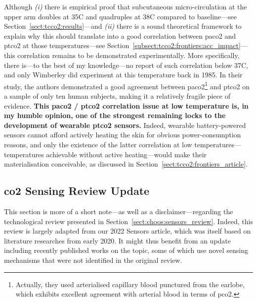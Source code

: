 Although \textit{(i)} there is empirical proof that subcutaneous micro-circulation at the upper arm doubles at 35{\degree}C and quadruples at 38{\degree}C compared to baseline---see Section~\ref{sect:tcco2:results}---and \textit{(ii)} there is a sound theoretical framework to explain why this should translate into a good correlation between \gls{paco2} and \gls{ptco2} at those temperatures---see Section~\ref{subsect:tcco2:frontiers:acc_impact}---this correlation remains to be demonstrated experimentally. More specifically, there is---to the best of my knowledge---no report of such correlation below 37{\degree}C, and only Wimberley \etal{} did experiment at this temperature back in 1985\cite{wimberley1985a}. In their study, the authors demonstrated a good agreement between \gls{paco2}\footnote{Actually, they used arterialised capillary blood punctured from the earlobe, which exhibits excellent agreement with arterial blood in terms of \gls{pco2}\cite{zavorsky2007}.} and \gls{ptco2} on a sample of only ten human subjects, making it a relatively fragile piece of evidence. \textbf{This \gls{paco2} / \gls{ptco2} correlation issue at low temperature is, in my humble opinion, one of the strongest remaining locks to the development of wearable \gls{ptco2} sensors.} Indeed, wearable battery-powered sensors cannot afford actively heating the skin for obvious power-consumption reasons, and only the existence of the latter correlation at low temperatures---\ie{} temperatures achievable without active heating---would make their materialisation conceivable, as discussed in Section~\ref{sect:tcco2:frontiers_article}.

\subsection{\texorpdfstring{\gls{co2}}{CO2} Sensing Review Update}

This section is more of a short note---as well as a disclaimer---regarding the technological review presented in Section~\ref{sect:choos:sensors_review}. Indeed, this review is largely adapted from our 2022 Sensors article\cite{dervieux2022}, which was itself based on literature researches from early 2020. It might thus benefit from an update including recently published works on the topic, some of which use novel sensing mechanisms that were not identified in the original review.

